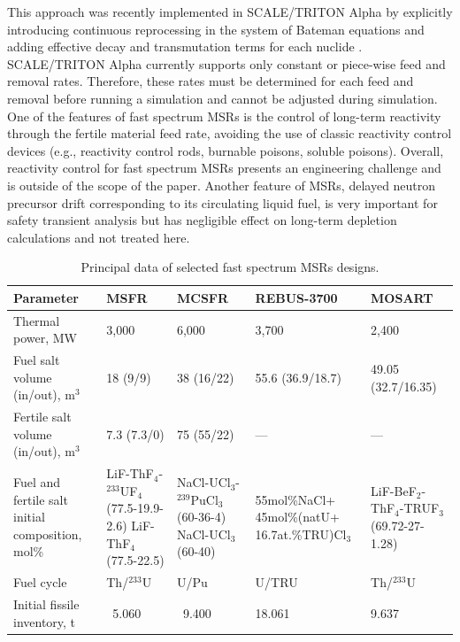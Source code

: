 \documentclass[letterpaper]{mandc2019}
\begin{document}
This approach was recently implemented in SCALE/TRITON Alpha by explicitly introducing continuous reprocessing in the system of Bateman equations and adding 
effective decay and transmutation terms for each nuclide \cite{betzler_implementation_2017-1}. SCALE/TRITON Alpha currently supports only constant or piece-wise feed and removal rates. Therefore, these rates must be determined for each feed and removal before running a simulation and cannot be adjusted during simulation. One of the features of fast spectrum \gls{MSR}s is the control of long-term reactivity through the fertile material feed rate, avoiding the use of classic reactivity control devices (e.g., reactivity control rods, burnable poisons, soluble poisons). Overall, reactivity control for fast spectrum \gls{MSR}s presents an engineering challenge and is outside of the scope of the paper. Another feature of \gls{MSR}s, delayed neutron precursor drift corresponding to its circulating liquid fuel, is very important for safety transient analysis but has negligible effect on long-term depletion calculations and  not treated here. 
\begin{table}[!htb]
\vspace{-0.3in}
  \centering
  \caption{Principal data of selected fast spectrum \glspl{MSR} designs.}
  \label{table:fsmsr_concepts}
  \begin{tabular}{p{} p{} p{} p{} p{}} \toprule
   Parameter & \gls{MSFR} & \gls{MCSFR} & REBUS-3700 & \gls{MOSART} \\ \midrule
   Thermal power, MW 				&  3,000 & 6,000     & 3,700 & 2,400   \\
   Fuel salt volume (in/out), m$^3$       &18 (9/9)& 38 (16/22)& 55.6 (36.9/18.7) & 49.05 (32.7/16.35) \\
   Fertile salt volume (in/out), m$^3$ & 7.3 (7.3/0) & 75 (55/22)    & --- & --- \\
   Fuel and fertile salt initial composition, mol\% & LiF-ThF$_4$-$^{233}$UF$_4$ (77.5-19.9-2.6) LiF-ThF$_4$ \newline (77.5-22.5) & NaCl-UCl$_3$-$^{239}$PuCl$_3$ (60-36-4) \newline NaCl-UCl$_3$ \newline (60-40)
   & 55mol\%NaCl+ 45mol\%(natU+ 16.7at.\%TRU)Cl$_3$
   & LiF-BeF$_2$-ThF$_4$-TRUF$_3$  \newline (69.72-27-1.28) \\
   Fuel cycle & Th/$^{233}$U & U/Pu  & U/TRU & Th/$^{233}$U \\
   Initial fissile inventory, t & \ 5.060 & \ 9.400    & 18.061 & 9.637 \\ \bottomrule
   \end{tabular}
   \vspace{-0.45in}
\end{table}
\end{document}
